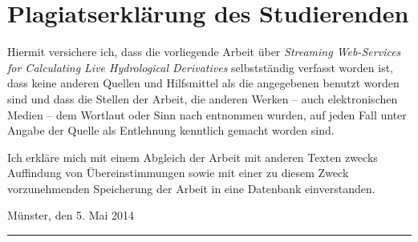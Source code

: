 \section*{Plagiatserklärung des Studierenden}
Hiermit versichere ich, dass die vorliegende Arbeit über \emph{Streaming Web-Services for Calculating Live Hydrological Derivatives} selbstständig verfasst worden ist, dass keine anderen Quellen und Hilfsmittel als die angegebenen benutzt worden sind und dass die Stellen der Arbeit, die anderen Werken – auch elektronischen Medien – dem Wortlaut oder Sinn nach entnommen wurden, auf jeden Fall unter Angabe der Quelle als Entlehnung kenntlich gemacht worden sind.

Ich erkläre mich mit einem Abgleich der Arbeit mit anderen Texten zwecks Auffindung von Übereinstimmungen sowie mit einer zu diesem Zweck vorzunehmenden Speicherung der Arbeit in eine Datenbank einverstanden.

\vspace{1cm}
Münster, den 5. Mai 2014\hspace{1cm}\rule{5cm}{.5pt}
